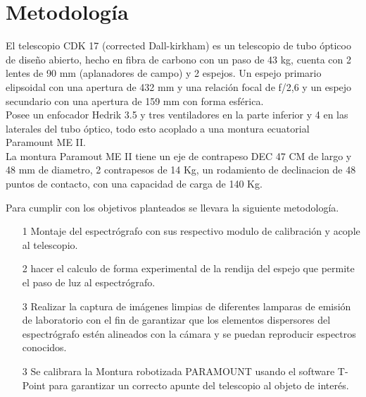 \documentclass[11pt]{article}
\begin{document}
\section{Metodolog\'ia}

El telescopio CDK 17 (corrected Dall-kirkham) es un telescopio de tubo ópticoo de diseño abierto, hecho en fibra de carbono con un paso de 43 kg, cuenta con 2 lentes de 90 mm (aplanadores de campo) y 2 espejos. 
Un espejo primario elipsoidal con una apertura de 432 mm y una relación focal de f/2,6 y un espejo secundario con una apertura de 159 mm con forma esférica.\\
Posee un enfocador Hedrik 3.5 y tres ventiladores en la parte inferior y 4 en las laterales del tubo óptico, todo esto acoplado a una montura ecuatorial Paramount ME II.\\
La montura Paramout ME II tiene un eje de contrapeso DEC 47 CM  de largo y 48 mm de diametro, 2 contrapesos de 14 Kg, un rodamiento de declinacion de 48 puntos de contacto, con una capacidad de carga de 140 Kg.






Para cumplir con los objetivos planteados se llevara la siguiente metodología.

\begin{itemize}

\item[1] Montaje del espectrógrafo con sus respectivo modulo de calibración y acople al telescopio.

\item[2] hacer el calculo de forma experimental de la rendija del espejo que permite el paso de luz al espectrógrafo.

\item[3] Realizar la captura de imágenes limpias de diferentes lamparas de emisión de laboratorio con el fin de garantizar que los elementos dispersores del espectrógrafo estén alineados con la cámara y se puedan reproducir espectros conocidos.

\item[3] Se calibrara la Montura robotizada PARAMOUNT  usando el software T-Point para garantizar un correcto apunte del telescopio al objeto de interés.



 
\end{itemize}

\end{document}
